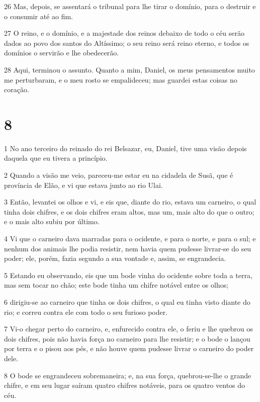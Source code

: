 \par 26 Mas, depois, se assentará o tribunal para lhe tirar o domínio, para o destruir e o consumir até ao fim.
\par 27 O reino, e o domínio, e a majestade dos reinos debaixo de todo o céu serão dados ao povo dos santos do Altíssimo; o seu reino será reino eterno, e todos os domínios o servirão e lhe obedecerão.
\par 28 Aqui, terminou o assunto. Quanto a mim, Daniel, os meus pensamentos muito me perturbaram, e o meu rosto se empalideceu; mas guardei estas coisas no coração.

\chapter{8}

\par 1 No ano terceiro do reinado do rei Belsazar, eu, Daniel, tive uma visão depois daquela que eu tivera a princípio.
\par 2 Quando a visão me veio, pareceu-me estar eu na cidadela de Susã, que é província de Elão, e vi que estava junto ao rio Ulai.
\par 3 Então, levantei os olhos e vi, e eis que, diante do rio, estava um carneiro, o qual tinha dois chifres, e os dois chifres eram altos, mas um, mais alto do que o outro; e o mais alto subiu por último.
\par 4 Vi que o carneiro dava marradas para o ocidente, e para o norte, e para o sul; e nenhum dos animais lhe podia resistir, nem havia quem pudesse livrar-se do seu poder; ele, porém, fazia segundo a sua vontade e, assim, se engrandecia.
\par 5 Estando eu observando, eis que um bode vinha do ocidente sobre toda a terra, mas sem tocar no chão; este bode tinha um chifre notável entre os olhos;
\par 6 dirigiu-se ao carneiro que tinha os dois chifres, o qual eu tinha visto diante do rio; e correu contra ele com todo o seu furioso poder.
\par 7 Vi-o chegar perto do carneiro, e, enfurecido contra ele, o feriu e lhe quebrou os dois chifres, pois não havia força no carneiro para lhe resistir; e o bode o lançou por terra e o pisou aos pés, e não houve quem pudesse livrar o carneiro do poder dele.
\par 8 O bode se engrandeceu sobremaneira; e, na sua força, quebrou-se-lhe o grande chifre, e em seu lugar saíram quatro chifres notáveis, para os quatro ventos do céu.
